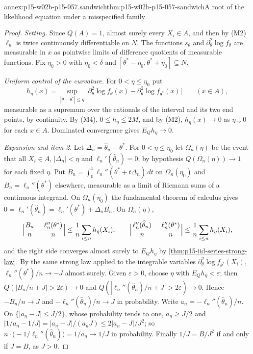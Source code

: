 \begin{annexitem}{annex:p15-w02b-p15-057.sandwich}{thm:p15-w02b-p15-057-sandwich}{A root of the likelihood equation under a misspecified family}
\begin{proof}
\emph{Setting.} Since \(Q(A)=1\), almost surely every \(X_i\in A\), and
then by (M2) \(\ell_n\) is twice continuously differentiable on \(N\). The
functions \(s_\theta\) and \(\partial_\theta^2\log f_\theta\) are
measurable in \(x\) as pointwise limits of difference quotients of
measurable functions. Fix \(\eta_0>0\) with \(\eta_0<\delta\) and
\([\theta^*-\eta_0,\theta^*+\eta_0]\subseteq N\).

\emph{Uniform control of the curvature.} For \(0<\eta\leq\eta_0\) put
\[
 h_\eta(x)=\sup_{|\theta-\theta^*|\leq\eta}
 \bigl|\partial_\theta^2\log f_\theta(x)-\partial_\theta^2\log
 f_{\theta^*}(x)\bigr|\qquad(x\in A),
\]
measurable as a supremum over the rationals of the interval and its two
end points, by continuity. By (M4), \(0\leq h_\eta\leq2M\), and by (M2),
\(h_\eta(x)\to0\) as \(\eta\downarrow0\) for each \(x\in A\). Dominated
convergence gives \(E_Qh_\eta\to0\).

\emph{Expansion and item 2.} Let \(\Delta_n=\widehat\theta_n-\theta^*\).
For \(0<\eta\leq\eta_0\) let \(\Omega_n(\eta)\) be the event that all
\(X_i\in A\), \(|\Delta_n|<\eta\) and \(\ell_n'(\widehat\theta_n)=0\); by
hypothesis \(Q(\Omega_n(\eta))\to1\) for each fixed \(\eta\). Put
\(B_n=\int_0^1\ell_n''(\theta^*+t\Delta_n)\,dt\) on \(\Omega_n(\eta_0)\)
and \(B_n=\ell_n''(\theta^*)\) elsewhere, measurable as a limit of
Riemann sums of a continuous integrand. On \(\Omega_n(\eta_0)\) the
fundamental theorem of calculus gives
\(0=\ell_n'(\widehat\theta_n)=\ell_n'(\theta^*)+\Delta_nB_n\). On
\(\Omega_n(\eta)\),
\[
 \Bigl|\frac{B_n}{n}-\frac{\ell_n''(\theta^*)}{n}\Bigr|
 \leq\frac1n\sum_{i\leq n}h_\eta(X_i),\qquad
 \Bigl|\frac{\ell_n''(\widehat\theta_n)}{n}-\frac{\ell_n''(\theta^*)}{n}\Bigr|
 \leq\frac1n\sum_{i\leq n}h_\eta(X_i),
\]
and the right side converges almost surely to \(E_Qh_\eta\) by
\cref{thm:p15-iid-series-strong-law}. By the same strong law applied to the
integrable variables \(\partial_\theta^2\log f_{\theta^*}(X_i)\),
\(\ell_n''(\theta^*)/n\to-J\) almost surely. Given \(\varepsilon>0\),
choose \(\eta\) with \(E_Qh_\eta<\varepsilon\); then
\(Q(|B_n/n+J|>2\varepsilon)\to0\) and
\(Q(|\ell_n''(\widehat\theta_n)/n+J|>2\varepsilon)\to0\). Hence
\(-B_n/n\to J\) and \(-\ell_n''(\widehat\theta_n)/n\to J\) in probability.
Write \(a_n=-\ell_n''(\widehat\theta_n)/n\). On \(\{|a_n-J|\leq J/2\}\),
whose probability tends to one, \(a_n\geq J/2\) and
\(|1/a_n-1/J|=|a_n-J|/(a_nJ)\leq2|a_n-J|/J^2\); so
\(n\cdot\bigl(-1/\ell_n''(\widehat\theta_n)\bigr)=1/a_n\to1/J\) in
probability. Finally \(1/J=B/J^2\) if and only if \(J=B\), as \(J>0\).


\end{proof}
\end{annexitem}
